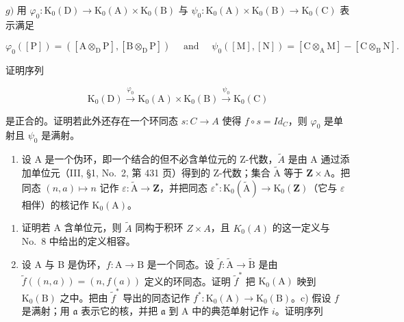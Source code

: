 \(g)\) 用 \(\varphi_0:\mathrm{K}_0(\mathrm{D})\to \mathrm{K}_0(\mathrm{A})\times \mathrm{K}_0(\mathrm{B})\) 与 \(\psi_0:\mathrm{K}_0(\mathrm{A})\times \mathrm{K}_0(\mathrm{B})\to \mathrm{K}_0(\mathrm{C})\) 表示满足

\[
\varphi_ {0} ([ \mathrm{P} ]) = ([ \mathrm{A} \otimes_ {\mathrm{D}} \mathrm{P} ], [ \mathrm{B} \otimes_ {\mathrm{D}} \mathrm{P} ]) \quad \text { and } \quad \psi_ {0} ([ \mathrm{M} ], [ \mathrm{N} ]) = [ \mathrm{C} \otimes_ {\mathrm{A}} \mathrm{M} ] - [ \mathrm{C} \otimes_ {\mathrm{B}} \mathrm{N} ].
\]

证明序列

\[
\mathrm{K} _ {0} (\mathrm{D}) \xrightarrow {\varphi_ {0}} \mathrm{K} _ {0} (\mathrm{A}) \times \mathrm{K} _ {0} (\mathrm{B}) \xrightarrow {\psi_ {0}} \mathrm{K} _ {0} (\mathrm{C})
\]

是正合的。证明若此外还存在一个环同态 \(s: C \to A\) 使得 \(f \circ s = Id_{C}\)，则 \(\varphi_{0}\) 是单射且 \(\psi_{0}\) 是满射。

\begin{enumerate}
\def\labelenumi{\arabic{enumi})}
\setcounter{enumi}{8}
\tightlist
\item
  设 A 是一个伪环，即一个结合的但不必含单位元的 Z-代数，\(\widetilde{A}\) 是由 A 通过添加单位元（III, §1, No.~2, 第 431 页）得到的 Z-代数；集合 \(\widetilde{\mathrm{A}}\) 等于 \(\mathbf{Z} \times \mathrm{A}\)。把同态 \((n, a) \mapsto n\) 记作 \(\varepsilon : \widetilde{\mathrm{A}} \to \mathbf{Z}\)，并把同态 \(\varepsilon^{*} : \mathrm{K}_{0}(\widetilde{\mathrm{A}}) \to \mathrm{K}_{0}(\mathbf{Z})\)（它与 \(\varepsilon\) 相伴）的核记作 \(\mathrm{K}_{0}(\mathrm{A})\)。
\end{enumerate}

\begin{enumerate}
\def\labelenumi{\alph{enumi})}
\item
  证明若 A 含单位元，则 \(\tilde{A}\) 同构于积环 \(Z \times A\)，且 \(K_{0}(A)\) 的这一定义与 No.~8 中给出的定义相容。
\item
  设 A 与 B 是伪环，\(f: \mathrm{A} \to \mathrm{B}\) 是一个同态。设 \(\widetilde{f}: \widetilde{\mathrm{A}} \to \widetilde{\mathrm{B}}\) 是由 \(\widetilde{f}((n, a)) = (n, f(a))\) 定义的环同态。证明 \(\widetilde{f}^*\) 把 \(\mathrm{K}_0(\mathrm{A})\) 映到 \(\mathrm{K}_0(\mathrm{B})\) 之中。把由 \(\widetilde{f}^*\) 导出的同态记作 \(f^*: \mathrm{K}_0(\mathrm{A}) \to \mathrm{K}_0(\mathrm{B})\)。c) 假设 \(f\) 是满射；用 \(\mathfrak{a}\) 表示它的核，并把 \(\mathfrak{a}\) 到 A 中的典范单射记作 \(i\)。证明序列
\end{enumerate}

